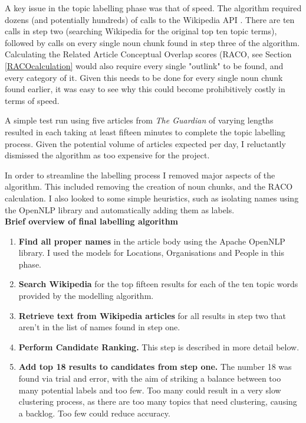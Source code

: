 \documentclass[12pt]{article}
\begin{document}
A key issue in the topic labelling phase was that of speed. The algorithm required dozens (and potentially hundreds) of calls to the Wikipedia API \cite{wikipedia}. There are ten calls in step two (searching Wikipedia for the original top ten topic terms), followed by calls on every single noun chunk found in step three of the algorithm. Calculating the Related Article Conceptual Overlap scores (RACO, see Section \ref{RACOcalculation} would also require every single "outlink" to be found, and every category of it. Given this needs to be done for every single noun chunk found earlier, it was easy to see why this could become prohibitively costly in terms of speed. 

A simple test run using five articles from \emph{The Guardian} \cite{guardian} of varying lengths resulted in each taking at least fifteen minutes to complete the topic labelling process. Given the potential volume of articles expected per day, I reluctantly dismissed the algorithm as too expensive for the project.

In order to streamline the labelling process I removed major aspects of the algorithm. This included removing the creation of noun chunks, and the RACO calculation. I also looked to some simple heuristics, such as isolating names using the OpenNLP library and automatically adding them as labels. \\

\textbf{Brief overview of final labelling algorithm} \\

\begin{enumerate}
	\item \textbf{Find all proper names} in the article body using the Apache OpenNLP \cite{opennlp} library. I used the models for Locations, Organisations and People in this phase. 
	\item \textbf{Search Wikipedia} for the top fifteen results for each of the ten topic words provided by the modelling algorithm. 
	\item \textbf{Retrieve text from Wikipedia articles} for all results in step two that aren't in the list of names found in step one. 
	\item \textbf{Perform Candidate Ranking.} This step is described in more detail below. 
	\item \textbf{Add top 18 results to candidates from step one.} The number 18 was found via trial and error, with the aim of striking a balance between too many potential labels and too few. Too many could result in a very slow clustering process, as there are too many topics that need clustering, causing a backlog. Too few could reduce accuracy. 
\end{enumerate}
\end{document}
